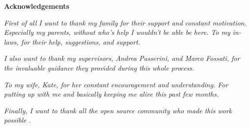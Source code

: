 \thispagestyle{empty}

\begin{center}
  {\bf \Huge Acknowledgements}
\end{center}

\vspace{4cm}



\textit{First of all I want to thank my family for their support and constant motivation. Especially my parents, without who's help I wouldn't be able be here. To my in-laws, for their help, suggestions, and support.}

\textit{I also want to thank my supervisors, Andrea Passerini, and Marco Fossati, for the invaluable guidance they provided during this whole process. }

\textit{To my wife, Kate, for her constant encouragement and understanding. For putting up with me and basically keeping me alive this past few months.}


\textit{Finally, I want to thank all the open source community who made this work possible .}

